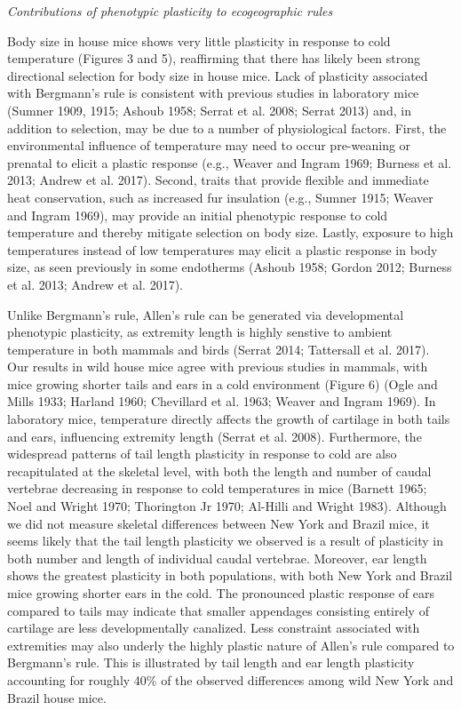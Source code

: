 \documentclass[]{article}
\begin{document}
\vspace{3.5mm}

\noindent\emph{Contributions of phenotypic plasticity to ecogeographic
rules}

Body size in house mice shows very little plasticity in response to cold
temperature (Figures 3 and 5), reaffirming that there has likely been
strong directional selection for body size in house mice. Lack of
plasticity associated with Bergmann's rule is consistent with previous
studies in laboratory mice (Sumner 1909, 1915; Ashoub 1958; Serrat et
al. 2008; Serrat 2013) and, in addition to selection, may be due to a
number of physiological factors. First, the environmental influence of
temperature may need to occur pre-weaning or prenatal to elicit a
plastic response (e.g., Weaver and Ingram 1969; Burness et al. 2013;
Andrew et al. 2017). Second, traits that provide flexible and immediate
heat conservation, such as increased fur insulation (e.g., Sumner 1915;
Weaver and Ingram 1969), may provide an initial phenotypic response to
cold temperature and thereby mitigate selection on body size. Lastly,
exposure to high temperatures instead of low temperatures may elicit a
plastic response in body size, as seen previously in some endotherms
(Ashoub 1958; Gordon 2012; Burness et al. 2013; Andrew et al. 2017).

Unlike Bergmann's rule, Allen's rule can be generated via developmental
phenotypic plasticity, as extremity length is highly senstive to ambient
temperature in both mammals and birds (Serrat 2014; Tattersall et al.
2017). Our results in wild house mice agree with previous studies in
mammals, with mice growing shorter tails and ears in a cold environment
(Figure 6) (Ogle and Mills 1933; Harland 1960; Chevillard et al. 1963;
Weaver and Ingram 1969). In laboratory mice, temperature directly
affects the growth of cartilage in both tails and ears, influencing
extremity length (Serrat et al. 2008). Furthermore, the widespread
patterns of tail length plasticity in response to cold are also
recapitulated at the skeletal level, with both the length and number of
caudal vertebrae decreasing in response to cold temperatures in mice
(Barnett 1965; Noel and Wright 1970; Thorington Jr 1970; Al-Hilli and
Wright 1983). Although we did not measure skeletal differences between
New York and Brazil mice, it seems likely that the tail length
plasticity we observed is a result of plasticity in both number and
length of individual caudal vertebrae. Moreover, ear length shows the
greatest plasticity in both populations, with both New York and Brazil
mice growing shorter ears in the cold. The pronounced plastic response
of ears compared to tails may indicate that smaller appendages
consisting entirely of cartilage are less developmentally canalized.
Less constraint associated with extremities may also underly the highly
plastic nature of Allen's rule compared to Bergmann's rule. This is
illustrated by tail length and ear length plasticity accounting for
roughly 40\% of the observed differences among wild New York and Brazil
house mice.
\end{document}
